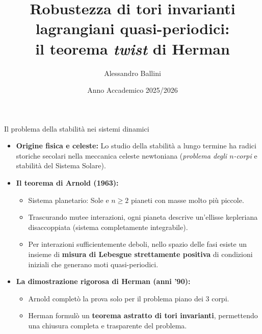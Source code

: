 \documentclass[10pt,aspectratio=169]{beamer}
\title{\textbf{Robustezza di tori invarianti lagrangiani quasi-periodici:}\\ \large il teorema \textit{twist} di Herman}
\author{Alessandro Ballini}
\institute{\large Università degli Studi di Roma Tor Vergata}
\date{Anno Accademico 2025/2026}
\newcommand{\blu}[1]{\textcolor{UniBlue}{\textbf{#1}}}
\begin{document}
\begin{frame}[plain]
  \titlepage
\end{frame}

\begin{frame}{Il problema della stabilità nei sistemi dinamici}
  \begin{itemize}
    \item \blu{Origine fisica e celeste:} Lo studio della stabilità a lungo termine ha radici storiche secolari nella meccanica celeste newtoniana (\emph{problema degli $n$-corpi} e stabilità del Sistema Solare).
    \medskip
    \item \blu{Il teorema di Arnold (1963):}
    \begin{itemize}
      \item Sistema planetario: Sole e $n \ge 2$ pianeti con masse molto più piccole.
      \item Trascurando mutee interazioni, ogni pianeta descrive un'ellisse kepleriana disaccoppiata (sistema \alert{completamente integrabile}).
      \item Per interazioni sufficientemente deboli, nello spazio delle fasi esiste un insieme di \textbf{misura di Lebesgue strettamente positiva} di condizioni iniziali che generano moti \alert{quasi-periodici}.
    \end{itemize}
    \medskip
    \item \blu{La dimostrazione rigorosa di Herman (anni '90):}
    \begin{itemize}
      \item Arnold completò la prova solo per il problema piano dei 3 corpi.
      \item Herman formulò un \textbf{teorema astratto di tori invarianti}, permettendo una chiusura completa e trasparente del problema.
    \end{itemize}
  \end{itemize}
\end{frame}
\end{document}
